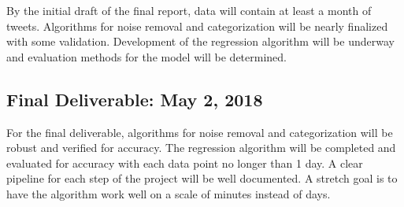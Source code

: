 \documentclass[sigconf]{acmart}
\begin{document}
By the initial draft of the final report, data will contain at least a month of tweets. Algorithms for noise removal and categorization will be nearly finalized with some validation. Development of the regression algorithm will be underway and evaluation methods for the model will be determined.

\subsection{Final Deliverable: May 2, 2018}

For the final deliverable, algorithms for noise removal and categorization will be robust and verified for accuracy. The regression algorithm will be completed and evaluated for accuracy with each data point no longer than 1 day. A clear pipeline for each step of the project will be well documented. A stretch goal is to have the algorithm work well on a scale of minutes instead of days.



\end{document}
